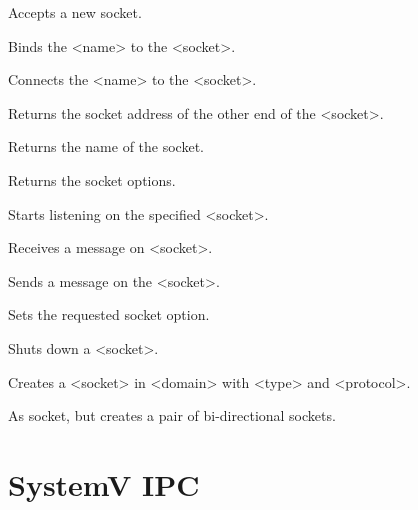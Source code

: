 \documentclass{refbase}
\begin{document}
\begin{enum}{1cm}

Accepts a new socket.

Binds the <name> to the <socket>.

Connects the <name> to the <socket>.

Returns the socket address of the other end of the <socket>.

Returns the name of the socket.

Returns the socket options.

Starts listening on the specified <socket>.

Receives a message on <socket>.

Sends a message on the <socket>.

Sets the requested socket option.

Shuts down a <socket>.

Creates a <socket> in <domain> with <type> and <protocol>.

As socket, but creates a pair of bi-directional sockets.

\end{enum}


\section{SystemV IPC} 
\end{document}
